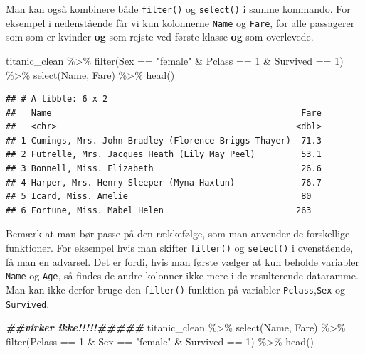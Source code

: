 \documentclass[
]{book}
\newenvironment{Shaded}{\begin{snugshade}}{\end{snugshade}}
\newcommand{\DecValTok}[1]{\textcolor[rgb]{0.00,0.00,0.81}{#1}}
\newcommand{\DocumentationTok}[1]{\textcolor[rgb]{0.56,0.35,0.01}{\textbf{\textit{#1}}}}
\newcommand{\FunctionTok}[1]{\textcolor[rgb]{0.00,0.00,0.00}{#1}}
\newcommand{\NormalTok}[1]{#1}
\newcommand{\SpecialCharTok}[1]{\textcolor[rgb]{0.00,0.00,0.00}{#1}}
\newcommand{\StringTok}[1]{\textcolor[rgb]{0.31,0.60,0.02}{#1}}
\begin{document}
Man kan også kombinere både \texttt{filter()} og \texttt{select()} i samme kommando. For eksempel i nedenstående får vi kun kolonnerne \texttt{Name} og \texttt{Fare}, for alle passagerer som som er kvinder \textbf{og} som rejste ved første klasse \textbf{og} som overlevede.

\begin{Shaded}
\begin{Highlighting}[]
\NormalTok{titanic\_clean }\SpecialCharTok{\%\textgreater{}\%} 
    \FunctionTok{filter}\NormalTok{(Sex }\SpecialCharTok{==} \StringTok{"female"} \SpecialCharTok{\&}\NormalTok{ Pclass }\SpecialCharTok{==} \DecValTok{1} \SpecialCharTok{\&}\NormalTok{ Survived }\SpecialCharTok{==} \DecValTok{1}\NormalTok{) }\SpecialCharTok{\%\textgreater{}\%}
    \FunctionTok{select}\NormalTok{(Name, Fare)  }\SpecialCharTok{\%\textgreater{}\%} 
    \FunctionTok{head}\NormalTok{()}
\end{Highlighting}
\end{Shaded}

\begin{verbatim}
## # A tibble: 6 x 2
##   Name                                                 Fare
##   <chr>                                               <dbl>
## 1 Cumings, Mrs. John Bradley (Florence Briggs Thayer)  71.3
## 2 Futrelle, Mrs. Jacques Heath (Lily May Peel)         53.1
## 3 Bonnell, Miss. Elizabeth                             26.6
## 4 Harper, Mrs. Henry Sleeper (Myna Haxtun)             76.7
## 5 Icard, Miss. Amelie                                  80  
## 6 Fortune, Miss. Mabel Helen                          263
\end{verbatim}

Bemærk at man bør passe på den rækkefølge, som man anvender de forskellige funktioner. For eksempel hvis man skifter \texttt{filter()} og \texttt{select()} i ovenstående, få man en advarsel. Det er fordi, hvis man første vælger at kun beholde variabler \texttt{Name} og \texttt{Age}, så findes de andre kolonner ikke mere i de resulterende dataramme. Man kan ikke derfor bruge den \texttt{filter()} funktion på variabler \texttt{Pclass},\texttt{Sex} og \texttt{Survived}.

\begin{Shaded}
\begin{Highlighting}[]
\DocumentationTok{\#\#virker ikke!!!!!\#\#\#\#\#}
\NormalTok{titanic\_clean }\SpecialCharTok{\%\textgreater{}\%} 
    \FunctionTok{select}\NormalTok{(Name, Fare)  }\SpecialCharTok{\%\textgreater{}\%} 
    \FunctionTok{filter}\NormalTok{(Pclass }\SpecialCharTok{==} \DecValTok{1} \SpecialCharTok{\&}\NormalTok{ Sex }\SpecialCharTok{==} \StringTok{"female"} \SpecialCharTok{\&}\NormalTok{ Survived }\SpecialCharTok{==} \DecValTok{1}\NormalTok{) }\SpecialCharTok{\%\textgreater{}\%}
    \FunctionTok{head}\NormalTok{()}
\end{Highlighting}
\end{Shaded}
\end{document}
